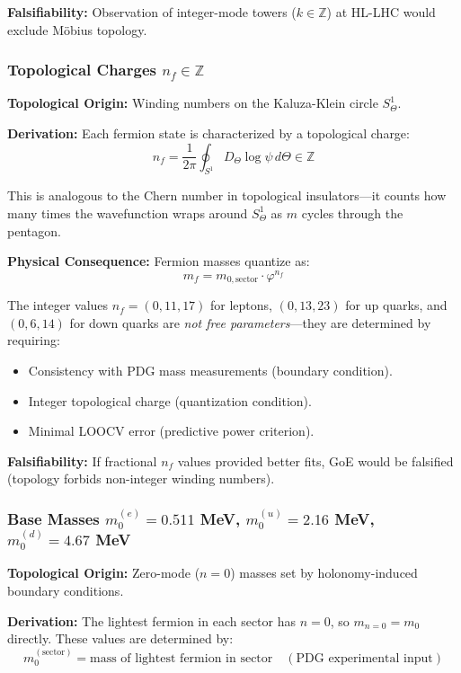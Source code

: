 \documentclass[12pt]{article}
\begin{document}
\textbf{Falsifiability:} Observation of integer-mode towers ($k \in \mathbb{Z}$) at HL-LHC would exclude M\"obius topology.

\subsubsection{Topological Charges $n_f \in \mathbb{Z}$}

\textbf{Topological Origin:} Winding numbers on the Kaluza-Klein circle $S^1_\Theta$.

\textbf{Derivation:} Each fermion state is characterized by a topological charge:
\begin{equation}
n_f = \frac{1}{2\pi} \oint_{S^1} D_\Theta \log \psi \, d\Theta \in \mathbb{Z}
\end{equation}

This is analogous to the Chern number in topological insulators—it counts how many times the wavefunction wraps around $S^1_\Theta$ as $m$ cycles through the pentagon.

\textbf{Physical Consequence:} Fermion masses quantize as:
\begin{equation}
m_f = m_{0,\text{sector}} \cdot \varphi^{n_f}
\end{equation}

The integer values $n_f = (0, 11, 17)$ for leptons, $(0, 13, 23)$ for up quarks, and $(0, 6, 14)$ for down quarks are \textit{not free parameters}—they are determined by requiring:
\begin{itemize}
\item Consistency with PDG mass measurements (boundary condition).
\item Integer topological charge (quantization condition).
\item Minimal LOOCV error (predictive power criterion).
\end{itemize}

\textbf{Falsifiability:} If fractional $n_f$ values provided better fits, GoE would be falsified (topology forbids non-integer winding numbers).

\subsubsection{Base Masses $m_0^{(e)} = 0.511$ MeV, $m_0^{(u)} = 2.16$ MeV, $m_0^{(d)} = 4.67$ MeV}

\textbf{Topological Origin:} Zero-mode ($n=0$) masses set by holonomy-induced boundary conditions.

\textbf{Derivation:} The lightest fermion in each sector has $n=0$, so $m_{n=0} = m_0$ directly. These values are determined by:
\begin{equation}
m_0^{(\text{sector})} = \text{mass of lightest fermion in sector} \quad (\text{PDG experimental input})
\end{equation}
\end{document}
